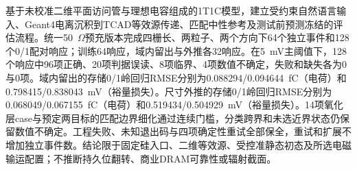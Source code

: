 基于未校准二维平面访问管与理想电容组成的1T1C模型，建立受约束自然语言输入、Geant4电离沉积到TCAD等效源传递、匹配中性参考及测试前预测冻结的评估流程。统一50~$\Omega$预充版本完成四栅长、两粒子、两个方向下64个独立事件和128个0/1配对响应；训练64响应，域内留出与外推各32响应。在5~mV主阈值下，128个响应中96项正确、20项判据误读、8项临界、4项数值不确定，失败和缺失各为0与0项。域内留出的存储0/1岭回归RMSE分别为0.088294/0.094644~fC（电荷）和0.798415/0.838043~mV（裕量损失）。尺寸外推的存储0/1岭回归RMSE分别为0.068049/0.067155~fC（电荷）和0.519434/0.504929~mV（裕量损失）。14项氧化层case与预定两目标的匹配边界细化通过连续门槛，分类跨界和未选近界状态仍保留数值不确定。工程失败、未知退出码与四项确定性重试全部保全，重试和扩展不增加独立事件数。结论限于固定硅入口、二维等效源、受控准静态初态及所选电磁输运配置；不推断持久位翻转、商业DRAM可靠性或辐射截面。
